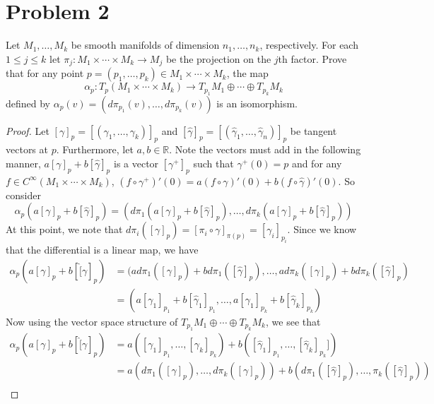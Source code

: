 \documentclass[a4paper]{article}
\begin{document}
\section*{Problem 2}%
Let $M_1, \dots, M_k$ be smooth manifolds of dimension $n_1, \dots, n_k$, respectively. For each $1 \leq j \leq k$ let $\pi_j: M_1 \times \cdots \times M_k \rightarrow M_j$ be the projection on the $j$th factor. Prove that for any point $p = (p_1, \dots, p_k) \in M_1 \times \cdots \times M_k$, the map
\[
  \alpha_p: T_p(M_1 \times \cdots \times M_k) \rightarrow T_{p_1}M_1 \oplus \cdots \oplus T_{p_k}M_k
\]
defined by $\alpha_p(v) = (d\pi_{p_1}(v), \dots, d\pi_{p_k}(v))$ is an isomorphism.

\begin{proof}
  Let $[\gamma]_p = [(\gamma_1, \dots, \gamma_k)]_p$ and $[\hat{\gamma}]_p = [(\hat{\gamma}_1, \dots, \hat{\gamma}_n)]_p$ be tangent vectors at $p$. Furthermore, let $a, b \in \mathds{R}$. Note the vectors must add in the following manner, $a[\gamma]_p + b[\hat{\gamma}]_p$ is a vector $[\gamma^+]_p$ such that $\gamma^+(0) = p$ and for any $f \in C^{\infty}(M_1 \times \cdots \times M_k)$, $(f \circ \gamma^+)'(0) = a(f \circ \gamma)'(0) + b(f \circ \hat{\gamma})'(0)$. So consider 
  \[
    \alpha_p \left( a [\gamma]_p + b [\hat{\gamma}]_p \right) =  (d\pi_{1}(a[\gamma]_p + b[\hat{\gamma}]_p), \dots, d\pi_{k}(a[\gamma]_p + b[\hat{\gamma}]_p))
  \]
  At this point, we note that $d \pi_{i}([\gamma]_p) = [\pi_i \circ \gamma]_{\pi(p)} = [\gamma_i]_{p_i}$. Since we know that the differential is a linear map, we have
  \[
    \begin{aligned}
      \alpha_p(a[\gamma]_p + b[\hat[\gamma]_p) &= (a d\pi_{1}([\gamma]_p) + b d\pi_{1}([\hat{\gamma}]_p), \dots, a d\pi_{k}([\gamma]_p) + b d\pi_{k}([\hat{\gamma}]_p) \\
                                               &= (a [\gamma_1]_{p_1} + b [\hat{\gamma}_1]_{p_1}, \dots, a [\gamma_1]_{p_k} + b [\hat{\gamma}_k]_{p_k})
    \end{aligned}
  \]
  Now using the vector space structure of $T_{p_1}M_1 \oplus \cdots \oplus T_{p_k}M_k$, we see that
  \[
    \begin{aligned}
      \alpha_p(a[\gamma]_p + b[\hat[\gamma]_p) &= a([\gamma_1]_{p_1}, \dots, [\gamma_k]_{p_k}) + b([\hat{\gamma}_1]_{p_1}, \dots, [\hat{\gamma}_k]_{p_k}]) \\
                                               &= a(d\pi_1([\gamma]_p), \dots, d\pi_k([\gamma]_p)) + b(d\pi_1([\hat{\gamma}]_p), \dots, \pi_k([\hat{\gamma}]_p)) \\

\end{aligned}\]
\end{proof}
\end{document}
